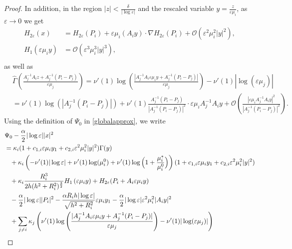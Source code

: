 \documentclass[11pt,reqno,a4paper]{amsart}
\numberwithin{equation}{section}
\newcommand{\ve}{\varepsilon}
\begin{document}
\begin{proof}
In addition, in the region $|z|<\frac{\delta}{|\log\ve|}$ and the rescaled variable $y=\frac{z}{\ve\mu_i}$, as $\ve\to 0$ we get 
\begin{equation}\label{expanH}
\begin{aligned}
    H_{2\ve}(x)&=H_{2\ve}(P_i)+\ve \mu_i\left(A_i y\right)\cdot\nabla H_{2\ve}(P_i) +\mathcal{O}(\ve^2 \mu_i^2 |y|^2),\\
    H_1(\ve \mu_i y)&=\mathcal{O}(\ve^3 \mu_i^3 |y|^3),\\
\end{aligned}
\end{equation}
as well as
\begin{equation}\label{expansionGamma}
\begin{aligned}
&\widehat{\Gamma}\left(\frac{A_j^{-1}A_iz+A_{j}^{-1}(P_i-P_j)}{\ve\mu_j}\right)=\nu'(1)\log\left(\frac{|A_j^{-1}A_i\ve\mu_i y +A_j^{-1}(P_i-P_j)|}{\ve\mu_j}\right)-\nu'(1)|\log(\ve\mu_j)|\\
&=\nu'(1)\log(|A_j^{-1}(P_i-P_j)|)+\nu'(1)\frac{A_j^{-1}(P_i-P_j)}{|A_j^{-1}(P_i-P_j)|^2}\cdot \ve\mu_i A_j^{-1}A_iy +\mathcal{O}\left(\frac{|\ve\mu_i A_j^{-1}A_iy|^2}{|A_j^{-1}(P_i-P_j)|^2}\right).
\end{aligned}
\end{equation}
Using the definition of $\Psi_0$ in \eqref{globalapprox}, we write
\begin{equation}\label{psiminusquad}
\begin{aligned}
&\Psi_0 -\frac{\alpha}{2}|\log\ve||x|^2 \\
&=\kappa_i(1+c_{1,i}\ve\mu_iy_1+c_{2,i}\ve^2\mu_i^2|y|^2)\Gamma(y)\\
&\hspace{3mm}+\kappa_i\left(-\nu'(1)|\log\ve|+\nu'(1)\log(\mu^{0}_{i})+\nu'(1)\log\Big(1+\frac{\mu^{*}_i}{\mu^{0}_i}\Big)\right)(1+c_{1,i}\ve\mu_iy_1+c_{2,i}\ve^2\mu_i^2|y|^2)\\
&\hspace{3mm}+\kappa_i\frac{R_i^3}{2h(h^2+R_i^2)^{\frac 3 2}}H_{1}\left(\ve \mu_i y\right) +H_{2\ve}(P_i+A_i\ve\mu_i y)\\
&\hspace{3mm}-\frac{\alpha}{2}|\log\ve||P_i|^2-\frac{\alpha R_ih|\log\ve|}{\sqrt{h^2+R_i^2}}\ve\mu_i y_1-\frac{\alpha}{2}|\log\ve|\ve^2\mu_i^2|A_iy|^2\\
&\hspace{3mm}+\sum_{j\neq i}\kappa_j\left(\nu'(1)\log\left(\frac{|A_j^{-1}A_i\ve \mu_i y +A_j^{-1}(P_i-P_j)|}{\ve \mu_j}\right)-\nu'(1)|\log(\ve\mu_j)|\right)\\

\end{aligned}
\end{equation}
\end{proof}
\end{document}
